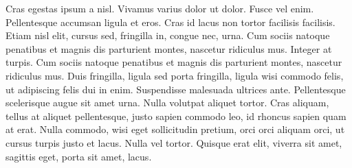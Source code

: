 \documentclass{book}
\begin{document}
Cras egestas ipsum a nisl. Vivamus varius dolor
ut dolor. Fusce vel enim. Pellentesque accumsan ligula et eros. Cras
id lacus non tortor facilisis facilisis. Etiam nisl elit, cursus
sed, fringilla in, congue nec, urna. Cum sociis natoque penatibus et
magnis dis parturient montes, nascetur ridiculus mus. Integer at
turpis. Cum sociis natoque penatibus et magnis dis parturient
montes, nascetur ridiculus mus. Duis fringilla, ligula sed porta
fringilla, ligula wisi commodo felis, ut adipiscing felis dui in
enim. Suspendisse malesuada ultrices ante.%
Pellentesque scelerisque
augue sit amet urna. Nulla volutpat aliquet tortor. Cras aliquam,
tellus at aliquet pellentesque, justo sapien commodo leo, id rhoncus
sapien quam at erat. Nulla commodo, wisi eget sollicitudin pretium,
orci orci aliquam orci, ut cursus turpis justo et lacus. Nulla vel
tortor. Quisque erat elit, viverra sit amet, sagittis eget, porta
sit amet, lacus.\tagmcend
\end{document}

